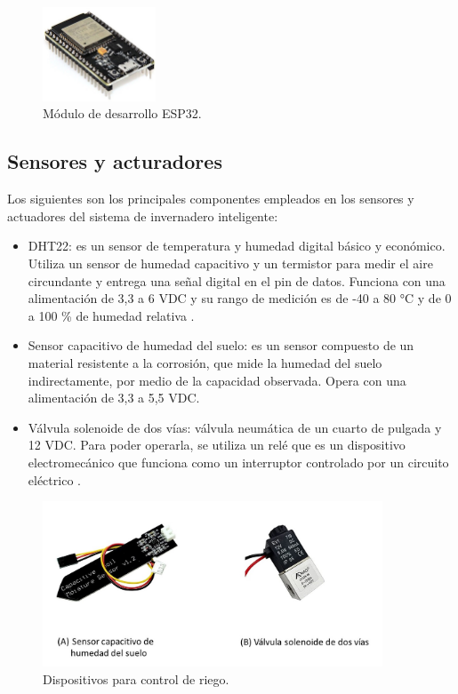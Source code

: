 \begin{figure}[h]
	\centering
	\includegraphics[width=0.30\textwidth]{./Figures/esp32.jpg}
	\caption[Módulo de desarrollo ESP32.]{Módulo de desarrollo ESP32.}
	\label{fig:soilsensor}

\end{figure}

\subsection{Sensores y acturadores}
\label{sec:Sensores y acturadores}
Los siguientes son los principales componentes empleados en los sensores y actuadores del sistema de invernadero inteligente:
\begin{itemize}

\item[] DHT22: es un sensor de temperatura y humedad digital básico y económico. Utiliza un sensor de humedad capacitivo y un termistor para medir el aire circundante y entrega una señal digital en el pin de datos. Funciona con una alimentación de 3,3 a 6 VDC y su rango de medición es de -40 a 80 °C y de 0 a 100 \% de humedad relativa \citep{dht22}.

\item[] Sensor capacitivo de humedad del suelo: es un sensor compuesto de un material resistente a la corrosión, que mide la humedad del suelo indirectamente, por medio de la capacidad observada. Opera con una alimentación de 3,3 a 5,5 VDC.

\item[] Válvula solenoide de dos vías: válvula neumática de un cuarto de pulgada y 12 VDC. Para poder operarla, se utiliza un relé que es un dispositivo electromecánico que funciona como un interruptor controlado por un circuito eléctrico \citep{valve}\citep{rele}.

\end{itemize}
\begin{figure}[h]
	\centering
	\includegraphics[width=0.90\textwidth]{./Figures/riego.jpg}
	\caption[Dispositivos para control de riego.]{Dispositivos para control de riego.}
	\label{fig:riego}

\end{figure}






